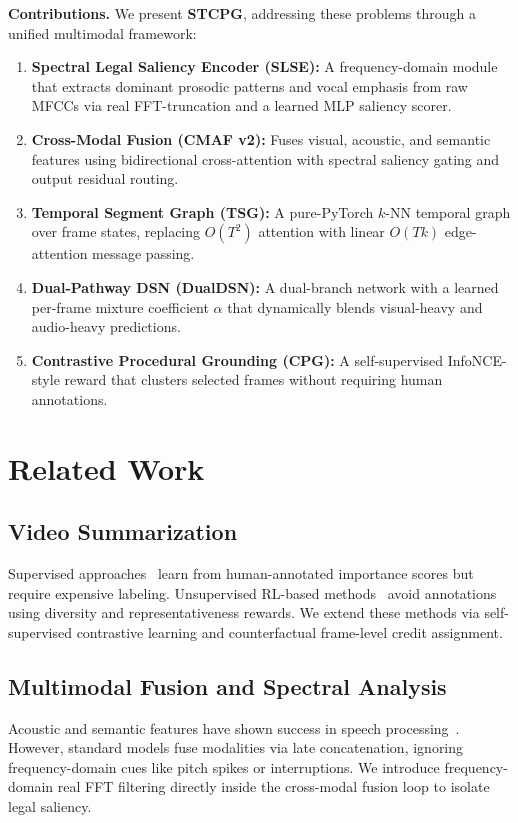 \documentclass[letterpaper]{article} %
\begin{document}
\textbf{Contributions.} We present \textbf{STCPG}, addressing these problems through a unified multimodal framework:
\begin{enumerate}
    \item \textbf{Spectral Legal Saliency Encoder (SLSE):} A frequency-domain module that extracts dominant prosodic patterns and vocal emphasis from raw MFCCs via real FFT-truncation and a learned MLP saliency scorer.
    \item \textbf{Cross-Modal Fusion (CMAF v2):} Fuses visual, acoustic, and semantic features using bidirectional cross-attention with spectral saliency gating and output residual routing.
    \item \textbf{Temporal Segment Graph (TSG):} A pure-PyTorch $k$-NN temporal graph over frame states, replacing $O(T^2)$ attention with linear $O(Tk)$ edge-attention message passing.
    \item \textbf{Dual-Pathway DSN (DualDSN):} A dual-branch network with a learned per-frame mixture coefficient $\alpha$ that dynamically blends visual-heavy and audio-heavy predictions.
    \item \textbf{Contrastive Procedural Grounding (CPG):} A self-supervised InfoNCE-style reward that clusters selected frames without requiring human annotations.
\end{enumerate}
\section{Related Work}

\subsection{Video Summarization}
Supervised approaches~\cite{zhang2016video,fajtl2019summarizing} learn from human-annotated importance scores but require expensive labeling. Unsupervised RL-based methods~\cite{zhou2018deep,mahasseni2017unsupervised} avoid annotations using diversity and representativeness rewards. We extend these methods via self-supervised contrastive learning and counterfactual frame-level credit assignment.

\subsection{Multimodal Fusion and Spectral Analysis}
Acoustic and semantic features have shown success in speech processing~\cite{radford2023robust}. However, standard models fuse modalities via late concatenation, ignoring frequency-domain cues like pitch spikes or interruptions. We introduce frequency-domain real FFT filtering directly inside the cross-modal fusion loop to isolate legal saliency.
\end{document}
